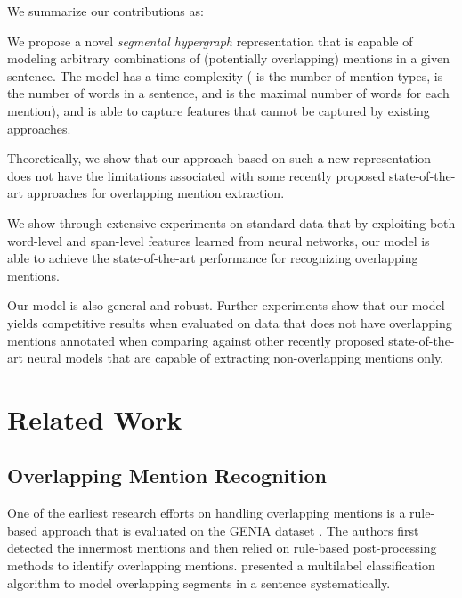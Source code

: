 \documentclass[11pt,a4paper]{article}
\theoremstyle{theorem}
\newcounter{Lcount}
\newcommand{\squishenum}{
\begin{list}{\arabic{Lcount}. }
{ \usecounter{Lcount}
\setlength{\itemsep}{0pt}
\setlength{\parsep}{0pt}
\setlength{\topsep}{0pt}
\setlength{\partopsep}{0pt}
\setlength{\leftmargin}{2em}
\setlength{\labelwidth}{1.5em}
\setlength{\labelsep}{0.5em} } }
\newcommand{\squishend}{
\end{list} }
\begin{document}
We summarize our contributions as:

\squishenum

\item We propose a novel {\em segmental hypergraph} representation that is capable of modeling arbitrary combinations of (potentially overlapping) mentions in a given sentence. The model has a  time complexity ( is the number of mention types,  is the number of words in a sentence, and  is the maximal number of words for each mention), and is able to capture features that cannot be  captured by existing approaches.



\item Theoretically, we show that our approach based on such a new representation does not have the limitations associated with some recently proposed state-of-the-art approaches for overlapping mention extraction.

\item We show through extensive experiments on standard data that by exploiting both {\color{black}word-level} and span-level features learned from neural networks, our model is able to achieve the state-of-the-art performance for recognizing overlapping mentions.


\squishend

Our model is also general and robust. Further experiments show that our model yields competitive results when evaluated on data that does not have overlapping mentions annotated when comparing against other recently proposed state-of-the-art neural models that are capable of extracting non-overlapping mentions only.


\section{Related Work}



\subsection*{Overlapping Mention Recognition}

One of the earliest research efforts on handling overlapping mentions is a rule-based approach \cite{zhang2004enhancing,zhou2004recognizing,zhou2006recognizing} that is evaluated on the GENIA dataset \cite{kim2003genia}. 
The authors first detected the innermost mentions and then relied on rule-based post-processing methods to identify overlapping mentions. 
\citet{mcdonald2005flexible} presented a multilabel classification algorithm to model overlapping segments in a sentence systematically.
\end{document}
